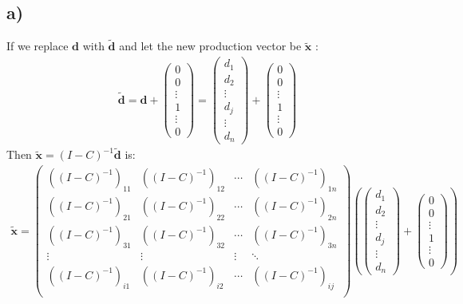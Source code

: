 \documentclass[12pt]{article}
\begin{document}
\subsection{a)}
If we replace $\textbf{d}$ with $\bm{\tilde{d}}$ and let the new production vector be $\bm{\tilde{x}}$ :
\begin{align*}
\bm{\tilde{d}} = \textbf{d}+
\left(\begin{array}{c}
0 \\
0 \\
\vdots \\
1 \\ 
\vdots \\
0
\end{array}\right)
= 
\left(\begin{array}{c}
d_1\\
d_2\\
\vdots \\
d_j \\ 
\vdots \\
d_n
\end{array}\right)
+
\left(\begin{array}{c}
0 \\
0 \\
\vdots \\
1 \\ 
\vdots \\
0
\end{array}\right)
\end{align*}
Then $\bm{\tilde{x}}=(I-C)^{-1}\bm{\tilde{d}}$ is:
\begin{align}
\bm{\tilde{x}}=\left(\begin{array}{cccccc|c}
     ((I-C)^{-1})_{11}  &   ((I-C)^{-1})_{12}  &      \cdots  &  ((I-C)^{-1})_{1n}  \\
     ((I-C)^{-1})_{21}  &   ((I-C)^{-1})_{22}  &      \cdots  &  ((I-C)^{-1})_{2n}  \\
     ((I-C)^{-1})_{31}  &   ((I-C)^{-1})_{32}  &     \cdots  &  ((I-C)^{-1})_{3n}  \\ 
     \vdots          &   \vdots  &   \vdots   &   \ddots  \\
     ((I-C)^{-1})_{i1}  &  ((I-C)^{-1})_{i2}  &     \cdots  &   ((I-C)^{-1})_{ij}  \\ 
\end{array}\right)
\left(
\left(\begin{array}{c}
d_1\\
d_2\\
\vdots \\
d_j \\ 
\vdots \\
d_n
\end{array}\right)
+
\left(\begin{array}{c}
0 \\
0 \\
\vdots \\
1 \\ 
\vdots \\0
\end{array}\right)
\right)
\end{align}
\end{document}
